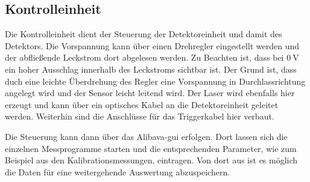\subsection{Kontrolleinheit}

Die Kontrolleinheit dient der Steuerung der Detektoreinheit und damit des Detektors.
Die Vorspannung kann über einen Drehregler eingestellt werden und der abfließende Leckstrom dort abgelesen werden.
Zu Beachten ist, dass bei $\SI{0}{\volt}$ ein hoher Ausschlag innerhalb des Leckstroms sichtbar ist.
Der Grund ist, dass duch eine leichte Überdrehung des Regler eine Vorspannung in Durchlassrichtung angelegt wird und der Sensor leicht leitend wird.
Der Laser wird ebenfalls hier erzeugt und kann über ein optisches Kabel an die Detektoreinheit geleitet werden.
Weiterhin sind die Anschlüsse für das Triggerkabel hier verbaut.

Die Steuerung kann dann über das Alibava-gui erfolgen.
Dort lassen sich die einzelnen Messprogramme starten und die entsprechenden Parameter, wie zum Beispiel aus den Kalibrationsmessungen, eintragen.
Von dort aus ist es möglich die Daten für eine weitergehende Auswertung abzuspeichern.
